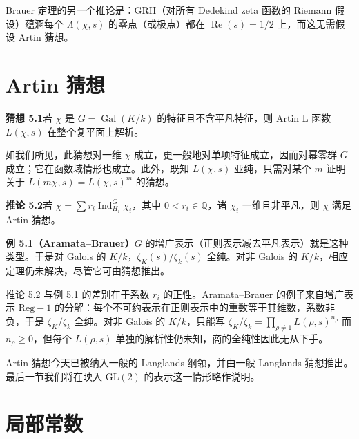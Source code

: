 Brauer 定理的另一个推论是：GRH（对所有 Dedekind zeta 函数的 Riemann 假设）蕴涵每个 $\Lambda(\chi,s)$ 的零点（或极点）都在 $\operatorname{Re}(s)=1/2$ 上，而这无需假设 Artin 猜想。

\section{Artin 猜想}\label{c4:sec:5}

\par\medskip\noindent\textbf{猜想 5.1}\quad 若 $\chi$ 是 $G=\operatorname{Gal}(K/k)$ 的特征且不含平凡特征，则 Artin L 函数 $L(\chi,s)$ 在整个复平面上解析。

如我们所见，此猜想对一维 $\chi$ 成立，更一般地对单项特征成立，因而对幂零群 $G$ 成立；它在函数域情形也成立。此外，既知 $L(\chi,s)$ 亚纯，只需对某个 $m$ 证明关于 $L(m\chi,s)=L(\chi,s)^{m}$ 的猜想。

\par\medskip\noindent\textbf{推论 5.2}\quad 若 $\chi=\sum r_i\operatorname{Ind}^{G}_{H_i}\chi_i$，其中 $0<r_i\in\mathbb{Q}$，诸 $\chi_i$ 一维且非平凡，则 $\chi$ 满足 Artin 猜想。

\par\medskip\noindent\textbf{例 5.1（Aramata--Brauer）}\quad $G$ 的增广表示（正则表示减去平凡表示）就是这种类型。于是对 Galois 的 $K/k$，$\zeta_K(s)/\zeta_k(s)$ 全纯。对非 Galois 的 $K/k$，相应定理仍未解决，尽管它可由猜想推出。

\begin{annote}
推论 5.2 与例 5.1 的差别在于系数 $r_i$ 的正性。Aramata--Brauer 的例子来自增广表示 $\mathrm{Reg}-1$ 的分解：每个不可约表示在正则表示中的重数等于其维数，系数非负，于是 $\zeta_K/\zeta_k$ 全纯。对非 Galois 的 $K/k$，只能写 $\zeta_K/\zeta_k=\prod_{\rho\neq1}L(\rho,s)^{n_\rho}$ 而 $n_\rho\ge0$，但每个 $L(\rho,s)$ 单独的解析性仍未知，商的全纯性因此无从下手。
\par\vspace{0.15em}{\raggedleft 【来源：Martinet 前引文（A）；Serre《Zeta and L functions》（A）】\par}
\end{annote}

Artin 猜想今天已被纳入一般的 Langlands 纲领，并由一般 Langlands 猜想推出。最后一节我们将在映入 $\mathrm{GL}(2)$ 的表示这一情形略作说明。

\section{局部常数}\label{c4:sec:6}

